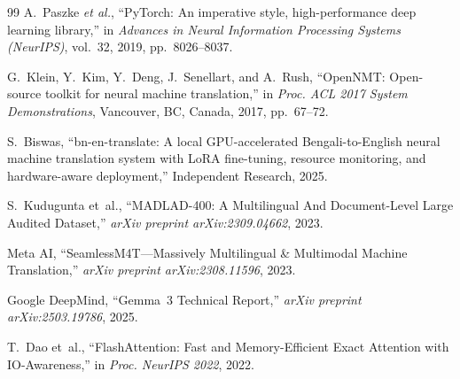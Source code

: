 \documentclass[conference]{IEEEtran}
\begin{document}
\begin{thebibliography}{99}
A.~Paszke \textit{et al.},
``PyTorch: An imperative style, high-performance deep learning library,''
in \emph{Advances in Neural Information Processing Systems (NeurIPS)},
vol.~32, 2019, pp.~8026--8037.

G.~Klein, Y.~Kim, Y.~Deng, J.~Senellart, and A.~Rush,
``OpenNMT: Open-source toolkit for neural machine translation,''
in \emph{Proc. ACL 2017 System Demonstrations},
Vancouver, BC, Canada, 2017, pp.~67--72.

S.~Biswas,
``bn-en-translate: A local GPU-accelerated Bengali-to-English neural
machine translation system with LoRA fine-tuning, resource monitoring,
and hardware-aware deployment,''
Independent Research, 2025.

S.~Kudugunta et~al.,
``MADLAD-400: A Multilingual And Document-Level Large Audited Dataset,''
\textit{arXiv preprint arXiv:2309.04662}, 2023.

Meta AI,
``SeamlessM4T---Massively Multilingual \& Multimodal Machine Translation,''
\textit{arXiv preprint arXiv:2308.11596}, 2023.

Google DeepMind,
``Gemma~3 Technical Report,''
\textit{arXiv preprint arXiv:2503.19786}, 2025.

T.~Dao et~al.,
``FlashAttention: Fast and Memory-Efficient Exact Attention with IO-Awareness,''
in \textit{Proc. NeurIPS 2022}, 2022.

\end{thebibliography}
\end{document}
